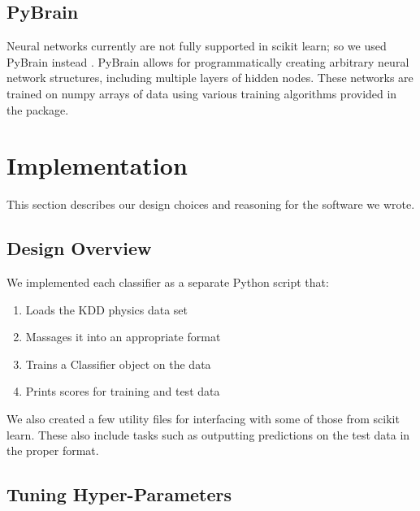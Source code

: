 \documentclass{article}
\begin{document}
\subsection{PyBrain}

Neural networks currently are not fully supported in scikit learn; so we used PyBrain instead \cite{schaul2010}.
PyBrain allows for programmatically creating arbitrary neural network structures, including multiple layers of hidden nodes.
These networks are trained on numpy arrays of data using various training algorithms provided in the package.


\section{Implementation}
\label{implementation}

This section describes our design choices and reasoning for the software we wrote.

\subsection{Design Overview}

We implemented each classifier as a separate Python script that:
\begin{enumerate}
\item Loads the KDD physics data set
\item Massages it into an appropriate format
\item Trains a Classifier object on the data
\item Prints scores for training and test data


\end{enumerate}

We also created a few utility files for interfacing with some of those from scikit learn.
These also include tasks such as outputting predictions on the test data in the proper format.


\subsection{Tuning Hyper-Parameters}


\end{document}
